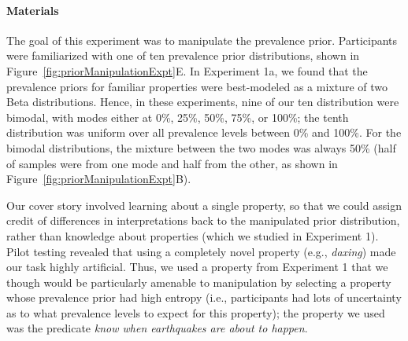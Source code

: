 \documentclass[floatsintext,doc]{apa6}
\let\oldparagraph\paragraph
\renewcommand{\paragraph}[1]{\oldparagraph{#1}\mbox{}}
\newcommand{\mht}[1]{{\textcolor{Blue}{[mht: #1]}}}
\begin{document}
\hypertarget{materials-1}{%
\paragraph{Materials}\label{materials-1}}
%
The goal of this experiment was to manipulate the prevalence prior.
Participants were familiarized with one of ten prevalence prior distributions, shown in Figure~\ref{fig:priorManipulationExpt}E.
In Experiment 1a, we found that the prevalence priors for familiar properties were best-modeled as a mixture of two Beta distributions.
Hence, in these experiments, nine of our ten distribution were bimodal, with modes either at 0\%, 25\%, 50\%, 75\%, or 100\%; the tenth distribution was uniform over all prevalence levels between 0\% and 100\%.
For the bimodal distributions, the mixture between the two modes was always 50\% (half of samples were from one mode and half from the other, as shown in Figure~\ref{fig:priorManipulationExpt}B).

Our cover story involved learning about a single property, so that we could assign credit of differences in interpretations back to the manipulated prior distribution, rather than knowledge about properties (which we studied in Experiment 1). 
Pilot testing revealed that using a completely novel property (e.g., \emph{daxing}) made our task highly artificial. 
Thus, we used a property from Experiment 1 that we though would be particularly amenable to manipulation by selecting a property whose prevalence prior had high entropy (i.e., participants had lots of uncertainty as to what prevalence levels to expect for this property); the property we used was the predicate \emph{know when earthquakes are about to happen}.
\end{document}
